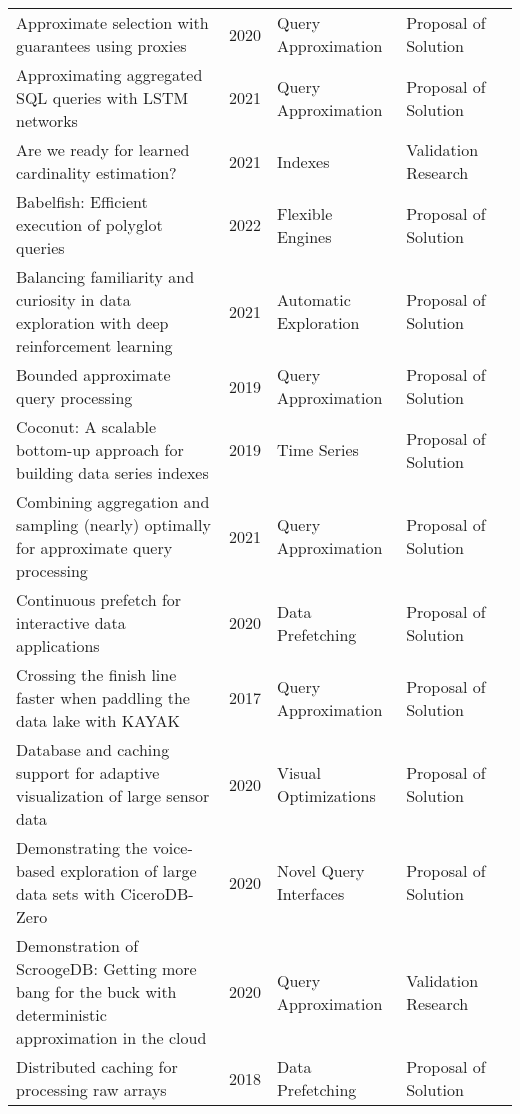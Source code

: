 \begin{longtable}{p{18em} l l l l}
Approximate selection with guarantees using proxies & 2020 & Query Approximation & Proposal of Solution & \cite{10.14778/3407790.3407804}\\ 
Approximating aggregated {SQL} queries with {LSTM} networks & 2021 & Query Approximation & Proposal of Solution & \cite{regev_approximating_2021}\\ 
Are we ready for learned cardinality estimation? & 2021 & Indexes & Validation Research & \cite{10.14778/3461535.3461552}\\ 
Babelfish: {Efficient} execution of polyglot queries & 2022 & Flexible Engines & Proposal of Solution & \cite{10.14778/3489496.3489501}\\ 
Balancing familiarity and curiosity in data exploration with deep reinforcement learning & 2021 & Automatic Exploration & Proposal of Solution & \cite{10.1145/3464509.3464884}\\ 
Bounded approximate query processing & 2019 & Query Approximation & Proposal of Solution & \cite{8502096}\\ 
Coconut: {A} scalable bottom-up approach for building data series indexes & 2019 & Time Series & Proposal of Solution & \cite{kondylakis_coconut_2019}\\ 
Combining aggregation and sampling (nearly) optimally for approximate query processing & 2021 & Query Approximation & Proposal of Solution & \cite{10.1145/3448016.3457277}\\ 
Continuous prefetch for interactive data applications & 2020 & Data Prefetching & Proposal of Solution & \cite{10.1145/3318464.3384405}\\ 
Crossing the finish line faster when paddling the data lake with {KAYAK} & 2017 & Query Approximation & Proposal of Solution & \cite{10.14778/3137765.3137792}\\ 
Database and caching support for adaptive visualization of large sensor data & 2020 & Visual Optimizations & Proposal of Solution & \cite{tanted_database_2020}\\ 
Demonstrating the voice-based exploration of large data sets with {CiceroDB}-{Zero} & 2020 & Novel Query Interfaces & Proposal of Solution & \cite{10.14778/3415478.3415496}\\ 
Demonstration of {ScroogeDB}: {Getting} more bang for the buck with deterministic approximation in the cloud & 2020 & Query Approximation & Validation Research & \cite{10.14778/3415478.3415519}\\ 
Distributed caching for processing raw arrays & 2018 & Data Prefetching & Proposal of Solution & \cite{zhao_distributed_2018}\\ 

\end{longtable}
